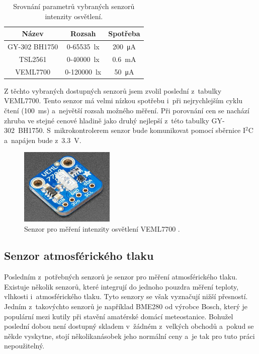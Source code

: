 \begin{table}[h]
    \caption{Srovnání parametrů vybraných senzorů intenzity osvětlení.}
    \centering
    \begin{tabular}{c|cc}
        \textbf{Název} & \textbf{Rozsah}            & \textbf{Spotřeba}         \\ \hline
        GY-302 BH1750 \cite{dat_BH1750}  & \SI{0}{}-\SI{65535}{\lux}  & \SI{200}{\micro\ampere}   \\
        TSL2561 \cite{dat_TSL2561}       & \SI{0}{}-\SI{40000}{\lux}  & \SI{0,6}{\milli\ampere}   \\
        VEML7700 \cite{dat_VEML7700}       & \SI{0}{}-\SI{120000}{\lux} & \SI{50}{\micro\ampere}
    \end{tabular}
    \label{tab_LuxIntensitySensors}
\end{table}

Z těchto vybraných dostupných senzorů jsem zvolil poslední z~tabulky VEML7700. Tento senzor má velmi nízkou spotřebu i~při nejrychlejším cyklu čtení (\SI{100}{\milli\second}) a~největší rozsah možného měření. Při porovnání cen se nachází zhruba ve stejné cenové hladině jako druhý nejlepší z~této tabulky GY-302~BH1750. S~mikrokontrolerem senzor bude komunikovat pomocí sběrnice I$^2$C a~napájen bude z~\SI{3,3}{\volt}.

\begin{figure}[h!]
    \centering
    \includegraphics[width=0.4\textwidth]{obrazky/veml7700.png}
    \caption[Senzor pro měření intenzity osvětlení VEML7700.]{Senzor pro měření intenzity osvětlení VEML7700 \cite{VEML7700}.}
    \label{fig_VEML7700}
\end{figure}

\subsection{Senzor atmosférického tlaku}

Posledním z~potřebných senzorů je senzor pro měření atmosférického tlaku. Existuje několik senzorů, které integrují do jednoho pouzdra měření teploty, vlhkosti i~atmosférického tlaku. Tyto senzory se však vyznačují nižší přesností. Jedním z~takovýchto senzorů je například BME280 od výrobce Bosch, který je populární mezi kutily při stavění amatérské domácí meteostanice. Bohužel poslední dobou není dostupný skladem v~žádném z~velkých obchodů a~pokud se někde vyskytne, stojí několikanásobek jeho normální ceny a~je tak pro tuto práci nepoužitelný.

